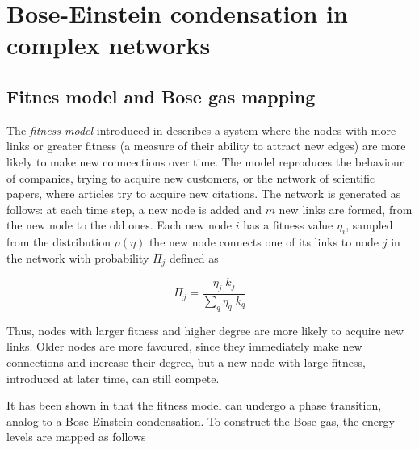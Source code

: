 \chapter{Bose-Einstein condensation in complex networks}

\section{Fitnes model and Bose gas mapping}
 



The \emph{fitness model} introduced in \cite{ba2000competition} describes a system where the nodes with more links or greater fitness (a measure of their ability to attract new edges) are more likely to make new conncections over time. The model reproduces the behaviour of companies, trying to acquire new customers, or the network of scientific papers, where articles try to acquire new citations. The network is generated as follows: at each time step, a new node is added and $m$ new links are formed, from the new node to the old ones. Each new node $i$ has a fitness value $\eta_i$, sampled from the distribution $\rho(\eta)$ the new node connects  one of its links to node $j$ in the network with probability $\Pi_j$ defined as 

\begin{equation}
    \Pi_j = \frac{\eta_j \; k_j}{\sum_q \eta_q\; k_q}
\end{equation}

Thus, nodes with larger fitness and higher degree are more likely to acquire new links. Older nodes are more favoured, since they immediately make new connections and increase their degree, but a new node with large fitness, introduced at later time, can still compete.

It has been shown in \cite{ba2001bose-einstein} that the fitness model can undergo a phase transition, analog to a Bose-Einstein condensation. To construct the Bose gas, the energy levels are mapped as follows

